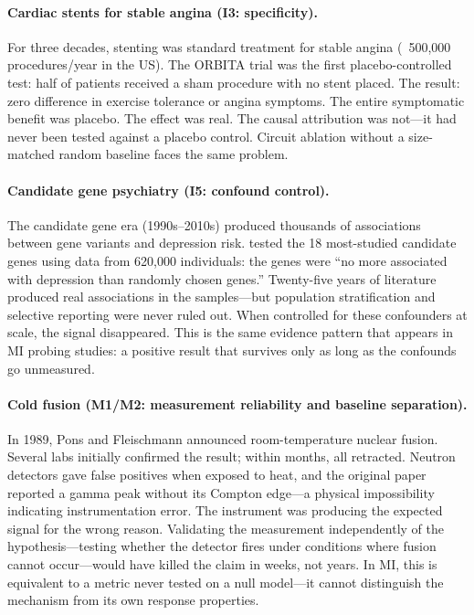 \documentclass{article}
\begin{document}
\paragraph{Cardiac stents for stable angina (I3: specificity).}
For three decades, stenting was standard treatment for stable angina (~500,000 procedures/year in the US). The ORBITA trial \citep{alhabib2018orbita} was the first placebo-controlled test: half of patients received a sham procedure with no stent placed. The result: zero difference in exercise tolerance or angina symptoms. The entire symptomatic benefit was placebo. The effect was real. The causal attribution was not---it had never been tested against a placebo control. Circuit ablation without a size-matched random baseline faces the same problem.

\paragraph{Candidate gene psychiatry (I5: confound control).}
The candidate gene era (1990s--2010s) produced thousands of associations between gene variants and depression risk. \citet{border2019no} tested the 18 most-studied candidate genes using data from 620,000 individuals: the genes were ``no more associated with depression than randomly chosen genes.'' Twenty-five years of literature produced real associations in the samples---but population stratification and selective reporting were never ruled out. When \citet{border2019no} controlled for these confounders at scale, the signal disappeared. This is the same evidence pattern that appears in MI probing studies: a positive result that survives only as long as the confounds go unmeasured.

\paragraph{Cold fusion (M1/M2: measurement reliability and baseline separation).}
In 1989, Pons and Fleischmann announced room-temperature nuclear fusion. Several labs initially confirmed the result; within months, all retracted. Neutron detectors gave false positives when exposed to heat, and the original paper reported a gamma peak without its Compton edge---a physical impossibility indicating instrumentation error. The instrument was producing the expected signal for the wrong reason. Validating the measurement independently of the hypothesis---testing whether the detector fires under conditions where fusion cannot occur---would have killed the claim in weeks, not years. In MI, this is equivalent to a metric never tested on a null model---it cannot distinguish the mechanism from its own response properties.
\end{document}
